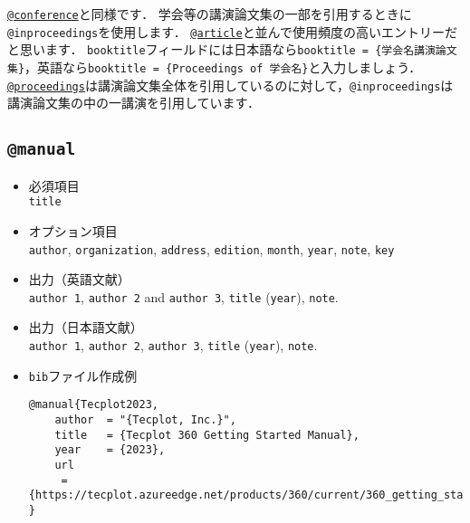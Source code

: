 \documentclass[a4paper,fleqn,uplatex,dvipdfmx]{jsarticle}
\makeatletter
\newcommand{\ttarticle}{\texttt{@article}}
\newcommand{\ttconference}{\texttt{@conference}}
\newcommand{\ttinproceedings}{\texttt{@inproceedings}}
\newcommand{\ttmanual}{\texttt{@manual}}
\newcommand{\ttproceedings}{\texttt{@proceedings}}
\makeatother
\begin{document}
\hyperref[ssec:conference]{\ttconference}と同様です．
学会等の講演論文集の一部を引用するときに\ttinproceedings を使用します．
\hyperref[ssec:article]{\ttarticle}と並んで使用頻度の高いエントリーだと思います．
\verb|booktitle|フィールドには日本語なら\texttt{booktitle = \{\colorbox[gray]{0.8}{学会名}講演論文集\}}，英語なら\texttt{booktitle = \{Proceedings of \colorbox[gray]{0.8}{学会名}\}}と入力しましょう．
\hyperref[ssec:proceedings]{\ttproceedings}は講演論文集全体を引用しているのに対して，\ttinproceedings は講演論文集の中の一講演を引用しています．


\subsection{\ttmanual}
\label{ssec:manual}
\begin{screen}
    \begin{itemize}
        \item 必須項目 \\
        \verb|title|
        \item オプション項目 \\
        \verb|author|, \verb|organization|, \verb|address|, \verb|edition|, \verb|month|, \verb|year|, \verb|note|, \verb|key|
        \item 出力（英語文献） \\
            \colorbox[gray]{0.8}{\texttt{author 1}}, \colorbox[gray]{0.8}{\texttt{author 2}} and \colorbox[gray]{0.8}{\texttt{author 3}}, \colorbox[gray]{0.8}{\texttt{title}} (\colorbox[gray]{0.8}{\texttt{year}}), \colorbox[gray]{0.8}{\texttt{note}}.
        \item 出力（日本語文献） \\
            \colorbox[gray]{0.8}{\texttt{author 1}}, \colorbox[gray]{0.8}{\texttt{author 2}}, \colorbox[gray]{0.8}{\texttt{author 3}}, \colorbox[gray]{0.8}{\texttt{title}} (\colorbox[gray]{0.8}{\texttt{year}}), \colorbox[gray]{0.8}{\texttt{note}}.
        \item \verb|bib|ファイル作成例 \vspace{-3mm}
\begin{verbatim}
@manual{Tecplot2023,
    author  = "{Tecplot, Inc.}",
    title   = {Tecplot 360 Getting Started Manual},
    year    = {2023},
    url    
     = {https://tecplot.azureedge.net/products/360/current/360_getting_started.pdf}
}
\end{verbatim}
    \end{itemize}
\end{screen}
\end{document}
